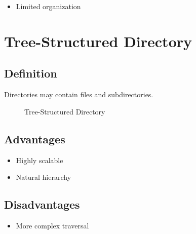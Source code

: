 \begin{itemize}
\item Limited organization
\end{itemize}

\section{Tree-Structured Directory}

\subsection{Definition}

Directories may contain files and subdirectories.

\begin{figure}[h]
\centering
{}
\caption{Tree-Structured Directory}
\end{figure}

\subsection{Advantages}

\begin{itemize}
\item Highly scalable
\item Natural hierarchy
\end{itemize}

\subsection{Disadvantages}

\begin{itemize}
\item More complex traversal
\end{itemize}

